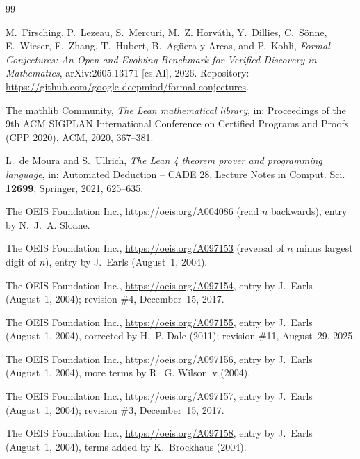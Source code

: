\documentclass[11pt]{amsart}
\theoremstyle{plain}
\theoremstyle{definition}
\begin{document}
{\small
\begin{thebibliography}{99}

M.~Firsching, P.~Lezeau, S.~Mercuri, M.~Z. Horv\'ath, Y.~Dillies, C.~S\"onne, E.~Wieser, F.~Zhang, T.~Hubert, B.~Ag\"uera y Arcas, and P.~Kohli, \emph{Formal Conjectures: An Open and Evolving Benchmark for Verified Discovery in Mathematics}, arXiv:2605.13171 [cs.AI], 2026. Repository: \url{https://github.com/google-deepmind/formal-conjectures}.

The mathlib Community, \emph{The Lean mathematical library}, in: Proceedings of the 9th ACM SIGPLAN International Conference on Certified Programs and Proofs (CPP 2020), ACM, 2020, 367--381.

L.~de Moura and S.~Ullrich, \emph{The Lean 4 theorem prover and programming language}, in: Automated Deduction -- CADE 28, Lecture Notes in Comput. Sci. \textbf{12699}, Springer, 2021, 625--635.

The OEIS Foundation Inc., \url{https://oeis.org/A004086} (read $n$ backwards), entry by N.~J.~A. Sloane.

The OEIS Foundation Inc., \url{https://oeis.org/A097153} (reversal of $n$ minus largest digit of $n$), entry by J.~Earls (August~1, 2004).

The OEIS Foundation Inc., \url{https://oeis.org/A097154}, entry by J.~Earls (August~1, 2004); revision \#4, December~15, 2017.

The OEIS Foundation Inc., \url{https://oeis.org/A097155}, entry by J.~Earls (August~1, 2004), corrected by H.~P. Dale (2011); revision \#11, August~29, 2025.

The OEIS Foundation Inc., \url{https://oeis.org/A097156}, entry by J.~Earls (August~1, 2004), more terms by R.~G. Wilson~v (2004).

The OEIS Foundation Inc., \url{https://oeis.org/A097157}, entry by J.~Earls (August~1, 2004); revision \#3, December~15, 2017.

The OEIS Foundation Inc., \url{https://oeis.org/A097158}, entry by J.~Earls (August~1, 2004), terms added by K.~Brockhaus (2004).

\end{thebibliography}
}
\end{document}
